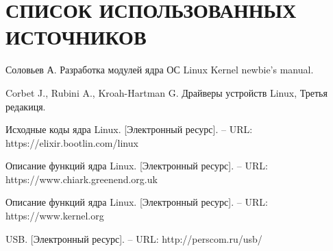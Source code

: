 \section*{СПИСОК ИСПОЛЬЗОВАННЫХ ИСТОЧНИКОВ}

\begingroup
\renewcommand{\section}[2]{}
\begin{thebibliography}{}
	Соловьев А. Разработка модулей ядра ОС Linux Kernel newbie's manual.

	Corbet J., Rubini A., Kroah-Hartman G. Драйверы устройств Linux, Третья редакиця.
	
	Исходные коды ядра Linux. [Электронный ресурс]. – URL: https://elixir.bootlin.com/linux
	
	Описание функций ядра Linux. [Электронный ресурс]. – URL: https://www.chiark.greenend.org.uk
	
	Описание функций ядра Linux.  [Электронный ресурс]. – URL: https://www.kernel.org
	
	USB. [Электронный ресурс].  – URL: http://perscom.ru/usb/
\end{thebibliography}


\endgroup

\pagebreak